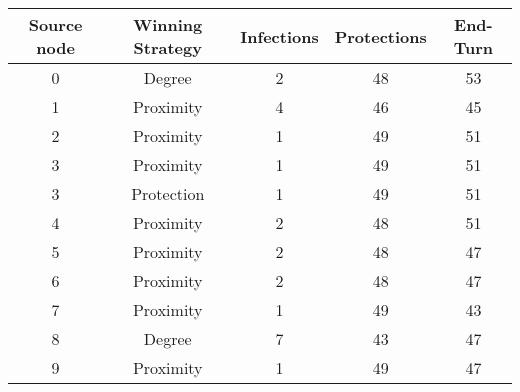 \documentclass[results.tex]{subfiles}
\begin{document}
    \begin{center}
        \begin{tabular}{| c || c | c | c | c |}
            \hline
            {\bfseries Source node} & {\bfseries Winning Strategy} & {\bfseries Infections} & {\bfseries Protections}
            & {\bfseries End-Turn}
            \\  %
            \hline\hline
            0                       & Degree                       & 2                      & 48                      & 53                   \\
            \hline
            1                       & Proximity                    & 4                      & 46                      & 45                   \\
            \hline
            2                       & Proximity                    & 1                      & 49                      & 51                   \\
            \hline
            3                       & Proximity                    & 1                      & 49                      & 51                   \\
            \hline
            3                       & Protection                   & 1                      & 49                      & 51                   \\
            \hline
            4                       & Proximity                    & 2                      & 48                      & 51                   \\
            \hline
            5                       & Proximity                    & 2                      & 48                      & 47                   \\
            \hline
            6                       & Proximity                    & 2                      & 48                      & 47                   \\
            \hline
            7                       & Proximity                    & 1                      & 49                      & 43                   \\
            \hline
            8                       & Degree                       & 7                      & 43                      & 47                   \\
            \hline
            9                       & Proximity                    & 1                      & 49                      & 47                   \\

\end{tabular}
\end{center}
\end{document}
